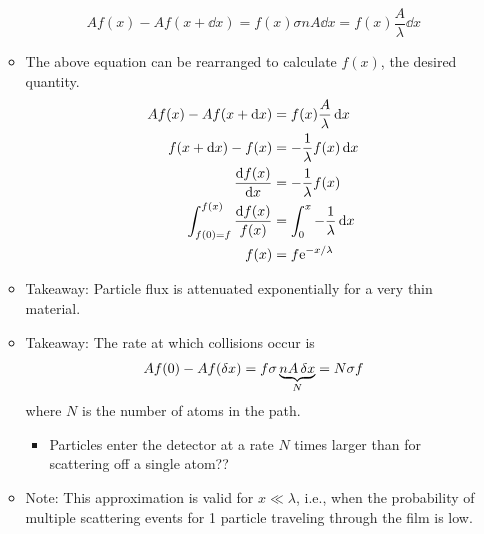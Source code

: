 \documentclass[../notes.tex]{subfiles}
\begin{document}
\begin{itemize}
\begin{itemize}
        \begin{equation*}
            Af(x)-Af(x+\dd{x}) = f(x)\sigma nA\dd{x} = f(x)\frac{A}{\lambda}\dd{x}
        \end{equation*}
        \item The above equation can be rearranged to calculate $f(x)$, the desired quantity.
        \begin{align*}
            Af(x)-Af(x+\dd{x}) &= f(x)\frac{A}{\lambda}\dd{x}\\
            f(x+\dd{x})-f(x) &= -\frac{1}{\lambda}f(x)\dd{x}\\
            \dv{f(x)}{x} &= -\frac{1}{\lambda}f(x)\\
            \int_{f(0)=f}^{f(x)}\frac{\dd{f(x)}}{f(x)} &= \int_0^x-\frac{1}{\lambda}\dd{x}\\
            f(x) &= f\e[-x/\lambda]
        \end{align*}
        \item Takeaway: Particle flux is attenuated exponentially for a very thin material.
        \item Takeaway: The rate at which collisions occur is
        \begin{equation*}
            Af(0)-Af(\var{x}) = f\sigma\underbrace{nA\var{x}}_N = N\sigma f
        \end{equation*}
        where $N$ is the number of atoms in the path.
        \begin{itemize}
            \item Particles enter the detector at a rate $N$ times larger than for scattering off a single atom??
        \end{itemize}
        \item Note: This approximation is valid for $x\ll\lambda$, i.e., when the probability of multiple scattering events for 1 particle traveling through the film is low.
    \end{itemize}
\end{itemize}
\end{document}
